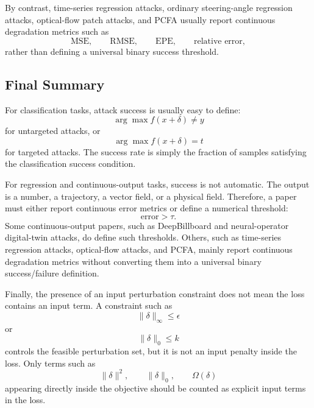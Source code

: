 \documentclass{article}
\begin{document}
By contrast, time-series regression attacks, ordinary steering-angle regression attacks, optical-flow patch attacks, and PCFA usually report continuous degradation metrics such as
\[
    \mathrm{MSE},
    \qquad
    \mathrm{RMSE},
    \qquad
    \mathrm{EPE},
    \qquad
    \text{relative error},
\]
rather than defining a universal binary success threshold.

\subsection{Final Summary}

For classification tasks, attack success is usually easy to define:
\[
    \arg\max f(x+\delta)\neq y
\]
for untargeted attacks, or
\[
    \arg\max f(x+\delta)=t
\]
for targeted attacks. The success rate is simply the fraction of samples satisfying the classification success condition.

For regression and continuous-output tasks, success is not automatic. The output is a number, a trajectory, a vector field, or a physical field. Therefore, a paper must either report continuous error metrics or define a numerical threshold:
\[
    \mathrm{error}>\tau.
\]
Some continuous-output papers, such as DeepBillboard and neural-operator digital-twin attacks, do define such thresholds. Others, such as time-series regression attacks, optical-flow attacks, and PCFA, mainly report continuous degradation metrics without converting them into a universal binary success/failure definition.

Finally, the presence of an input perturbation constraint does not mean the loss contains an input term. A constraint such as
\[
    \|\delta\|_\infty\leq \epsilon
\]
or
\[
    \|\delta\|_0\leq k
\]
controls the feasible perturbation set, but it is not an input penalty inside the loss. Only terms such as
\[
    \|\delta\|^2,
    \qquad
    \|\delta\|_0,
    \qquad
    \Omega(\delta)
\]
appearing directly inside the objective should be counted as explicit input terms in the loss.
\end{document}
